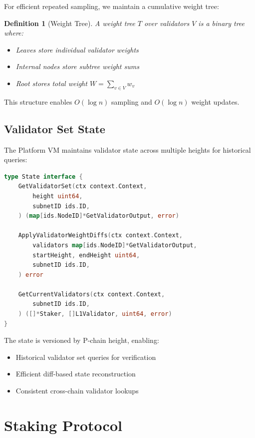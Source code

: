 \documentclass[11pt,letterpaper]{article}
\newtheorem{definition}{Definition}
\begin{document}
For efficient repeated sampling, we maintain a cumulative weight tree:

\begin{definition}[Weight Tree]
A weight tree $T$ over validators $V$ is a binary tree where:
\begin{itemize}
    \item Leaves store individual validator weights
    \item Internal nodes store subtree weight sums
    \item Root stores total weight $W = \sum_{v \in V} w_v$
\end{itemize}
\end{definition}

This structure enables $O(\log n)$ sampling and $O(\log n)$ weight updates.

\subsection{Validator Set State}

The Platform VM maintains validator state across multiple heights for historical queries:

\begin{lstlisting}[language=Go, caption=Validator State Interface]
type State interface {
    GetValidatorSet(ctx context.Context,
        height uint64,
        subnetID ids.ID,
    ) (map[ids.NodeID]*GetValidatorOutput, error)

    ApplyValidatorWeightDiffs(ctx context.Context,
        validators map[ids.NodeID]*GetValidatorOutput,
        startHeight, endHeight uint64,
        subnetID ids.ID,
    ) error

    GetCurrentValidators(ctx context.Context,
        subnetID ids.ID,
    ) ([]*Staker, []L1Validator, uint64, error)
}
\end{lstlisting}

The state is versioned by P-chain height, enabling:
\begin{itemize}
    \item Historical validator set queries for verification
    \item Efficient diff-based state reconstruction
    \item Consistent cross-chain validator lookups
\end{itemize}

\section{Staking Protocol}
\end{document}

